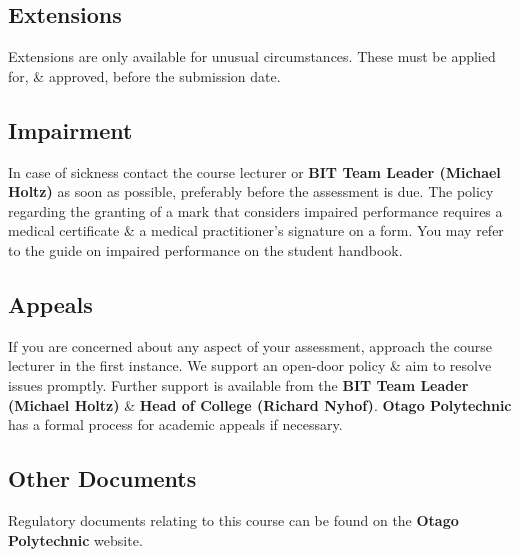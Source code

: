 \documentclass{article}
\begin{document}
\subsection*{Extensions}
Extensions are only available for unusual circumstances. These must be applied for, \& approved, before the submission date.

\subsection*{Impairment}
In case of sickness contact the course lecturer or \textbf{BIT Team Leader (Michael Holtz)} as soon as possible, preferably before the assessment is due. The policy regarding the granting of a mark that considers impaired performance requires a medical certificate \& a medical practitioner’s signature on a form. You may refer to the guide on impaired performance on the student handbook.

\subsection*{Appeals}
If you are concerned about any aspect of your assessment, approach the course lecturer in the first instance. We support an open-door policy \& aim to resolve issues promptly. Further support is available from the \textbf{BIT Team Leader (Michael Holtz)} \& \textbf{Head of College (Richard Nyhof)}. \textbf{Otago Polytechnic} has a formal process for academic appeals if necessary.

\subsection*{Other Documents}
Regulatory documents relating to this course can be found on the \textbf{Otago Polytechnic} website.
\end{document}
